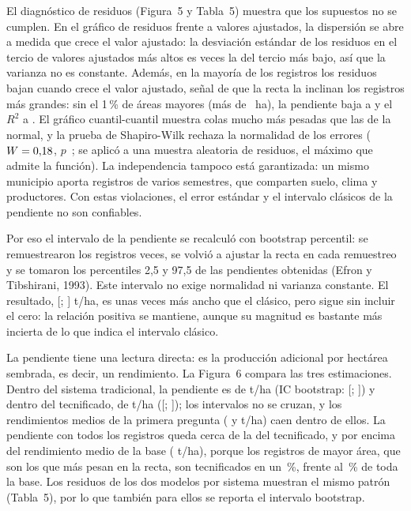 \documentclass[12pt,letterpaper]{article}
\begin{document}
El diagnóstico de residuos (Figura~5 y Tabla~5) muestra que los supuestos no
se cumplen. En el gráfico de residuos frente a valores ajustados, la
dispersión se abre a medida que crece el valor ajustado: la desviación
estándar de los residuos en el tercio de valores ajustados más altos es
\RGDERazon{} veces la del tercio más bajo, así que la varianza no es
constante. Además, en la mayoría de los registros los residuos bajan cuando
crece el valor ajustado, señal de que la recta la inclinan los registros más
grandes: sin el 1\,\% de áreas mayores (más de \CorteArea{}~ha), la pendiente
baja a \RGPenSinGrandes{} y el $R^2$ a \RGRdosSinGrandes. El gráfico
cuantil-cuantil muestra colas mucho más pesadas que las de la normal, y la
prueba de Shapiro-Wilk rechaza la normalidad de los errores ($W = 0{,}18$,
$p$~\RGSWpRel; se aplicó a una muestra aleatoria de \RGSWn{} residuos, el
máximo que admite la función). La independencia tampoco está garantizada: un
mismo municipio aporta registros de varios semestres, que comparten suelo,
clima y productores. Con estas violaciones, el error estándar y el intervalo
clásicos de la pendiente no son confiables.

Por eso el intervalo de la pendiente se recalculó con bootstrap percentil: se
remuestrearon los registros \BBoot{} veces, se volvió a ajustar la recta en
cada remuestreo y se tomaron los percentiles 2,5 y 97,5 de las pendientes
obtenidas (Efron y Tibshirani, 1993). Este intervalo no exige normalidad ni
varianza constante. El resultado, [\RGBootLi; \RGBootLs] t/ha, es unas
\RGBootRazonAncho{} veces más ancho que el clásico, pero sigue sin incluir el
cero: la relación positiva se mantiene, aunque su magnitud es bastante más
incierta de lo que indica el intervalo clásico.

La pendiente tiene una lectura directa: es la producción adicional por
hectárea sembrada, es decir, un rendimiento. La Figura~6 compara las tres
estimaciones. Dentro del sistema tradicional, la pendiente es de
\RTradPenEst{} t/ha (IC bootstrap: [\RTradBootLi; \RTradBootLs]) y dentro del
tecnificado, de \RTecPenEst{} t/ha ([\RTecBootLi; \RTecBootLs]); los
intervalos no se cruzan, y los rendimientos medios de la primera pregunta
(\MediaTrad{} y \MediaTec{} t/ha) caen dentro de ellos. La pendiente con todos
los registros queda cerca de la del tecnificado, y por encima del rendimiento
medio de la base (\MediaRendGlobal{} t/ha), porque los registros de mayor área,
que son los que más pesan en la recta, son tecnificados en un
\PctTecGrandes\,\%, frente al \PctTecTotal\,\% de toda la base. Los residuos de
los dos modelos por sistema muestran el mismo patrón (Tabla~5), por lo que
también para ellos se reporta el intervalo bootstrap.
\end{document}
